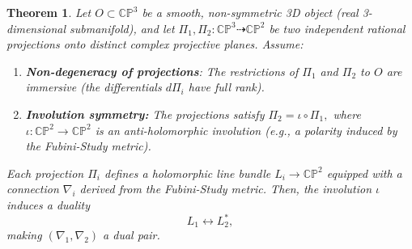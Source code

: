 \documentclass[10pt,a4paper]{amsart}
\newtheorem{thm}{Theorem}
\begin{document}
\begin{thm}\label{P:1} Let \( O \subset \mathbb{CP}^3 \) be a smooth, non-symmetric 3D object (real 3-dimensional submanifold), and let \( \Pi_1, \Pi_2: \mathbb{CP}^3 \dashrightarrow \mathbb{CP}^2 \) be two independent rational projections onto distinct complex projective planes. Assume:

\begin{enumerate}
\item  {\bf Non-degeneracy of projections}: The restrictions of \( \Pi_1 \) and \( \Pi_2 \) to \( O \) are immersive (the differentials \( d\Pi_i \) have full rank).

\item  {\bf Involution symmetry:} The projections satisfy \(\Pi_2 = \iota \circ \Pi_1 ,\) where \( \iota: \mathbb{CP}^2 \to \mathbb{CP}^2 \) is an anti-holomorphic involution (e.g., a polarity induced by the Fubini-Study metric).

\end{enumerate}

Each projection \( \Pi_i \) defines a holomorphic line bundle \( L_i \to \mathbb{CP}^2 \) equipped with a connection \( \nabla_i \) derived from the Fubini-Study metric. Then, the  involution \( \iota \) induces a duality \[ L_1 \leftrightarrow L_2^* ,\] making \( (\nabla_1, \nabla_2) \) a dual pair.
\end{thm}
\end{document}
